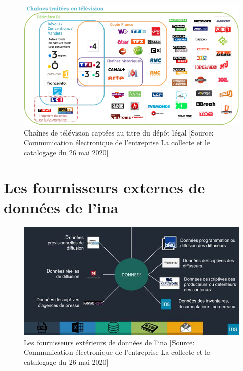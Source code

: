 \begin{figure}[!h]
	\centering
	\includegraphics[width=16cm]{images/dl_tv.png}
	\caption[Chaînes de télévision captées au titre du dépôt légal]{Chaînes de télévision captées au titre du dépôt légal [Source: Communication électronique  de l'entreprise \og La collecte et le catalogage\fg{} du 26 mai 2020]}
	\label{dl_tv}
\end{figure}

\chapter{\label{annexe_fournisseurs_exterieurs}Les fournisseurs externes de données de l'\ac{ina}}

\begin{figure}[!h]
	\centering
	\includegraphics[width=16cm]{images/enrichissement_dl.jpg}
	\caption[Les fournisseurs extérieurs de données de l'\ac{ina}]{Les fournisseurs extérieurs de données de l'\ac{ina} [Source: Communication électronique  de l'entreprise \og La collecte et le catalogage\fg{} du 26 mai 2020]}
	\label{enrichissement_dl}
\end{figure}

